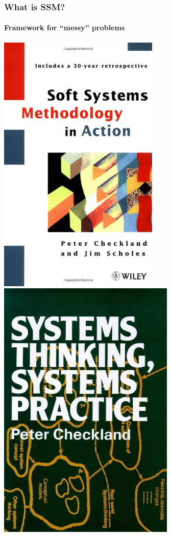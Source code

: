 \documentclass{beamer}
\begin{document}
\begin{frame}
  \frametitle{What is SSM?}
  \framesubtitle{Framework for ``messy'' problems}
  \begin{center}
    \includegraphics[height=0.8\textheight]{ssma.jpg}
    \quad
    \includegraphics[height=0.8\textheight]{stsp.jpg}
  \end{center}
\end{frame}
\end{document}
